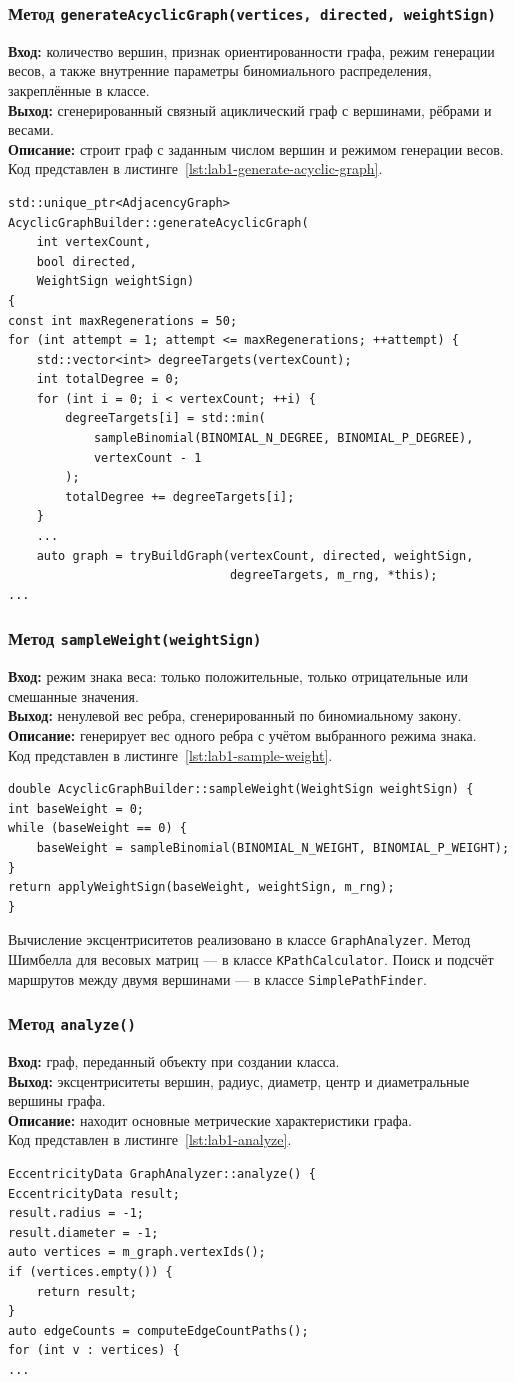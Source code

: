 \documentclass[14pt,a4paper]{extarticle}
\newcommand{\funcblock}[5]{%
\subsubsection*{Метод \code{#1}}
\noindent
\textbf{Вход:} #2\\
\textbf{Выход:} #3\\
\textbf{Описание:} #4\\
Код представлен в листинге~\ref{#5}.%
}
\newcommand{\code}[1]{\texttt{#1}}
\begin{document}
\funcblock
{generateAcyclicGraph(vertices, directed, weightSign)}
{количество вершин, признак ориентированности графа, режим генерации весов, а также внутренние параметры биномиального распределения, закреплённые в классе.}
{сгенерированный связный ациклический граф с вершинами, рёбрами и весами.}
{строит граф с заданным числом вершин и режимом генерации весов.}
{lst:lab1-generate-acyclic-graph}
\begin{lstlisting}[style=cppcode,caption={Фрагмент функции \code{generateAcyclicGraph(vertices, directed, weightSign)}},label={lst:lab1-generate-acyclic-graph}]
std::unique_ptr<AdjacencyGraph> AcyclicGraphBuilder::generateAcyclicGraph(
    int vertexCount,
    bool directed,
    WeightSign weightSign)
{
const int maxRegenerations = 50;
for (int attempt = 1; attempt <= maxRegenerations; ++attempt) {
    std::vector<int> degreeTargets(vertexCount);
    int totalDegree = 0;
    for (int i = 0; i < vertexCount; ++i) {
        degreeTargets[i] = std::min(
            sampleBinomial(BINOMIAL_N_DEGREE, BINOMIAL_P_DEGREE),
            vertexCount - 1
        );
        totalDegree += degreeTargets[i];
    }
    ...
    auto graph = tryBuildGraph(vertexCount, directed, weightSign,
                               degreeTargets, m_rng, *this);
...
\end{lstlisting}

\funcblock
{sampleWeight(weightSign)}
{режим знака веса: только положительные, только отрицательные или смешанные значения.}
{ненулевой вес ребра, сгенерированный по биномиальному закону.}
{генерирует вес одного ребра с учётом выбранного режима знака.}
{lst:lab1-sample-weight}
\begin{lstlisting}[style=cppcode,caption={Фрагмент функции \code{sampleWeight(weightSign)}},label={lst:lab1-sample-weight}]
double AcyclicGraphBuilder::sampleWeight(WeightSign weightSign) {
int baseWeight = 0;
while (baseWeight == 0) {
    baseWeight = sampleBinomial(BINOMIAL_N_WEIGHT, BINOMIAL_P_WEIGHT);
}
return applyWeightSign(baseWeight, weightSign, m_rng);
}
\end{lstlisting}

Вычисление эксцентриситетов реализовано в классе \code{GraphAnalyzer}. Метод Шимбелла для весовых матриц --- в классе \code{KPathCalculator}. Поиск и подсчёт маршрутов между двумя вершинами --- в классе \code{SimplePathFinder}.

\funcblock
{analyze()}
{граф, переданный объекту при создании класса.}
{эксцентриситеты вершин, радиус, диаметр, центр и диаметральные вершины графа.}
{находит основные метрические характеристики графа.}
{lst:lab1-analyze}
\begin{lstlisting}[style=cppcode,caption={Фрагмент функции \code{analyze()}},label={lst:lab1-analyze}]
EccentricityData GraphAnalyzer::analyze() {
EccentricityData result;
result.radius = -1;
result.diameter = -1;
auto vertices = m_graph.vertexIds();
if (vertices.empty()) {
    return result;
}
auto edgeCounts = computeEdgeCountPaths();
for (int v : vertices) {
...
\end{lstlisting}
\end{document}
